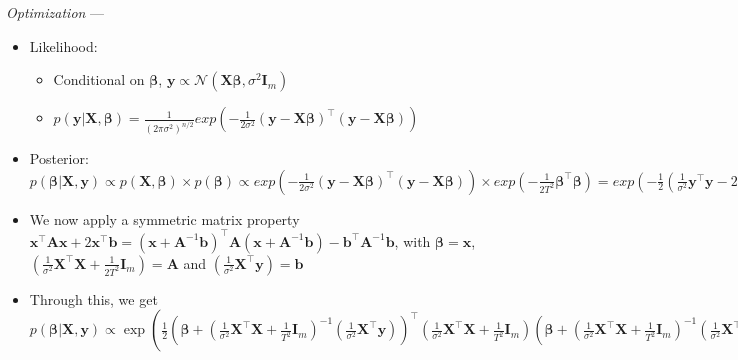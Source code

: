 \emph{Optimization} --- 
\begin{itemize}
    \item Likelihood: 
    \begin{itemize}
        \item Conditional on $\boldsymbol{\beta}$, $\boldsymbol{y} \propto \mathcal{N}(\boldsymbol{X} \boldsymbol{\beta}, \sigma^2 \boldsymbol{I}_m)$
        \item $p( \boldsymbol{y} | \boldsymbol{X}, \boldsymbol{\beta} ) = \frac{ 1 }{ (2\pi\sigma^2)^{n/2}} exp ( -\frac{1}{2\sigma^2} (\boldsymbol{y} - \boldsymbol{X} \boldsymbol{\beta})^\intercal (\boldsymbol{y} - \boldsymbol{X} \boldsymbol{\beta}) ) $
    \end{itemize}
    \item Posterior: $p( \boldsymbol{\beta} | \boldsymbol{X}, \boldsymbol{y} ) \propto p ( \boldsymbol{X}, \boldsymbol{\beta} ) \times p( \boldsymbol{\beta} ) \propto exp ( -\frac{1}{2\sigma^2} (\boldsymbol{y} - \boldsymbol{X} \boldsymbol{\beta})^\intercal (\boldsymbol{y} - \boldsymbol{X} \boldsymbol{\beta}) ) \times exp( -\frac{1}{2T^2} \boldsymbol{\beta}^\intercal \boldsymbol{\beta} ) = exp ( -\frac{1}{2} (\frac{1}{\sigma^2} \boldsymbol{y}^\intercal \boldsymbol{y} - 2 \boldsymbol{\beta}^\intercal \boldsymbol{X}^\intercal \boldsymbol{y} + \boldsymbol{\beta}^\intercal \boldsymbol{X}^\intercal \boldsymbol{X} \boldsymbol{\beta}) + \frac{1}{2T^2} \boldsymbol{\beta}^\intercal \boldsymbol{\beta}) \propto exp ( -\frac{1}{2} (\boldsymbol{\beta}^\intercal (\frac{1}{\sigma^2} \boldsymbol{X}^\intercal \boldsymbol{X} + \frac{1}{2T^2} \boldsymbol{I}_m) \boldsymbol{\beta} - \frac{2}{\sigma^2} \boldsymbol{\beta}^\intercal \boldsymbol{X}^\intercal \boldsymbol{y} )$
    \item We now apply a symmetric matrix property $\boldsymbol{x}^\intercal \boldsymbol{A} \boldsymbol{x} + 2 \boldsymbol{x}^\intercal \boldsymbol{b} = ( \boldsymbol{x} + \boldsymbol{A}^{-1} \boldsymbol{b} )^\intercal \boldsymbol{A} ( \boldsymbol{x} + \boldsymbol{A}^{-1} \boldsymbol{b} ) - \boldsymbol{b}^\intercal \boldsymbol{A}^{-1} \boldsymbol{b}$, with $\boldsymbol{\beta} = \boldsymbol{x}$, $(\frac{1}{\sigma^2} \boldsymbol{X}^\intercal \boldsymbol{X} + \frac{1}{2T^2} \boldsymbol{I}_m) = \boldsymbol{A}$ and $(\frac{1}{\sigma^2} \boldsymbol{X}^\intercal \boldsymbol{y}) = \boldsymbol{b}$
    \item Through this, we get $p( \boldsymbol{\beta} | \boldsymbol{X}, \boldsymbol{y} ) \propto \exp (  \frac{1}{2}  ( \boldsymbol{\beta} + ( \frac{1}{\sigma^2} \boldsymbol{X}^\intercal \boldsymbol{X} + \frac{1}{T^2} \boldsymbol{I}_m )^{-1} ( \frac{1}{\sigma^2} \boldsymbol{X}^\intercal \boldsymbol{y} ) )^\intercal ( \frac{1}{\sigma^2} \boldsymbol{X}^\intercal \boldsymbol{X} + \frac{1}{T^2} \boldsymbol{I}_m ) ( \boldsymbol{\beta} + ( \frac{1}{\sigma^2} \boldsymbol{X}^\intercal \boldsymbol{X} + \frac{1}{T^2} \boldsymbol{I}_m )^{-1} ( \frac{1}{\sigma^2} \boldsymbol{X}^\intercal \boldsymbol{y} ) ) )$

\end{itemize}

